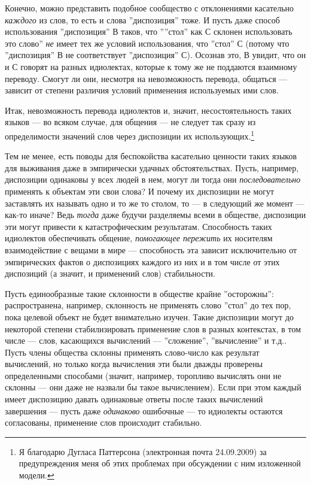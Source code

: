 \documentclass[11pt]{book}
\begin{document}
Конечно, можно представить подобное сообщество с отклонениями касательно \textit{каждого} из слов, то есть и слова ''диспозиция'' тоже. И пусть даже способ использования ''диспозиция'' В таков, что ''''стол'' как С склонен использовать это слово'' \textit{не} имеет тех же условий использования, что ''стол'' С (потому что ''диспозиция'' В не соответствует ''диспозиция'' С). Осознав это, В увидит, что он и С говорят на разных идиолектах, которые к тому же не поддаются взаимному переводу. Смогут ли они, несмотря на невозможность перевода, общаться --- зависит от степени различия условий применения используемых ими слов.

Итак, невозможность перевода идиолектов и, значит, несостоятельность таких языков --- во всяком случае, для общения --- не следует так сразу из определимости значений слов через диспозиции их использующих.\footnote{Я благодарю Дугласа Паттерсона (электронная почта 24.09.2009) за предупреждения меня об этих проблемах при обсуждении с ним изложенной модели.}

Тем не менее, есть поводы для беспокойства касательно ценности таких языков для выживания даже в эмпирически удачных обстоятельствах. Пусть, например, диспозиции одинаковы у всех людей в нем, могут ли тогда они \textit{последовательно} применять к объектам эти свои слова? И почему их диспозиции не могут заставлять их называть одно и то же то столом, то --- в следующий же момент --- как-то иначе? Ведь \textit{тогда} даже будучи разделяемы всеми в обществе, диспозиции эти могут привести к катастрофическим результатам. Способность таких идиолектов обеспечивать общение, \textit{помогающее пережить} их носителям взаимодействие с вещами в мире --- способность эта зависит исключительно от эмпирических фактов о диспозициях каждого из них и в том числе от этих диспозиций (а значит, и применений слов) стабильности.

Пусть единообразные такие склонности в обществе крайне ''осторожны'': распространена, например, склонность не применять слово ''стол'' до тех пор, пока целевой объект не будет внимательно изучен. Такие диспозиции могут до некоторой степени стабилизировать применение слов в разных контекстах, в том числе --- слов, касающихся вычислений --- ''сложение'', ''вычисление'' и т.д.. Пусть члены общества склонны применять слово-число как результат вычислений, но только когда вычисления эти были дважды проверены определенными способами (значит, например, торопливо вычислять они не склонны --- они даже не назвали бы такое вычислением). Если при этом каждый имеет диспозицию давать одинаковые ответы после таких вычислений завершения --- пусть даже \textit{одинаково} ошибочные --- то идиолекты остаются согласованы, применение слов происходит стабильно.
\end{document}
